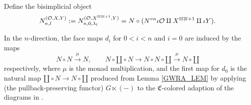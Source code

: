 \documentclass[a4paper,10pt
,draft
]{article}%
\renewcommand{\1}{\eta}%
\newcommand{\SC}{\Sigma_{\mathfrak C}}
\newcommand{\OC}{\Omega_{\mathfrak C}}
\begin{document}
\begin{definition}
      Define the bisimplicial object
      \begin{equation}
            N_{n,l}^{(\mathcal{O},X,Y)}
            := N_{n,0,\lambda_l}^{(\mathcal{O}, X^{\amalg 2l+1}, Y)}
            = N \circ (N^{\circ n} \iota \mathcal{O} \amalg X^{\amalg 2l + 1} \amalg \iota Y).
      \end{equation}
      
      In the $n$-direction, the face maps $d_i$ for $0 < i < n$ and $i=0$ are induced by the maps
      \begin{equation}
            N \circ N \xrightarrow{\mu} N,
            \qquad
            N \circ \amalg \circ N \to N \circ N \circ \amalg \xrightarrow{\mu} N \circ \amalg            
      \end{equation}
      respectively, 
      where $\mu$ is the monad multiplication,
      and the first map for $d_0$ is the natural map $\amalg \circ N \to N \circ \amalg$
      produced from Lemma \ref{GWRA_LEM} by applying (the pullback-preserving functor) $G \ltimes (-)$
      to the $\mathfrak C$-colored adaption of the diagrams in \cite[(5.34)]{BP_geo}.

\end{definition}
\end{document}

